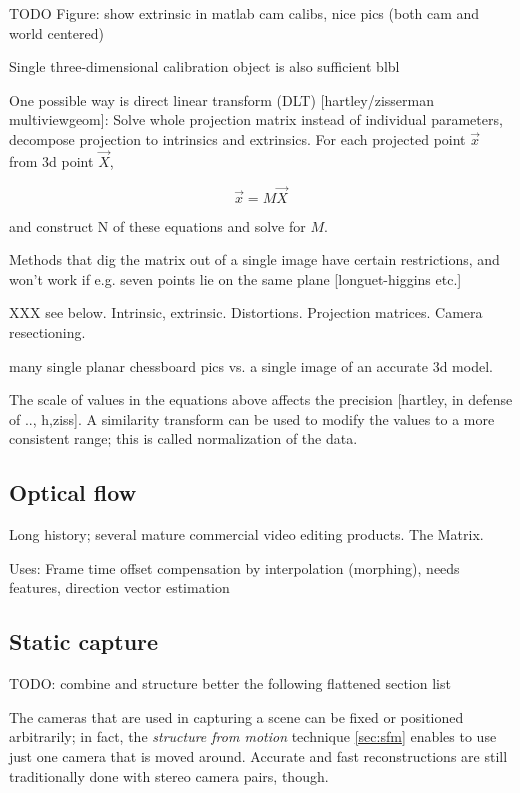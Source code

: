 TODO Figure: show extrinsic in matlab cam calibs, nice pics (both cam and world centered)

Single three-dimensional calibration object is also sufficient blbl

One possible way is direct linear transform (DLT) [hartley/zisserman multiviewgeom]: Solve whole projection matrix instead of individual parameters, decompose projection to intrinsics and extrinsics. For each projected point $\vec x$ from 3d point $\vec X$,

\[
	\vec x = M \vec X
\]

and construct N of these equations and solve for $M$.

Methods that dig the matrix out of a single image have certain restrictions, and won't work if e.g. seven points lie on the same plane [longuet-higgins etc.]

XXX see below. Intrinsic, extrinsic. Distortions. Projection matrices. Camera resectioning.

many single planar chessboard pics vs. a single image of an accurate 3d model.

The scale of values in the equations above affects the precision [hartley, in defense of .., h,ziss]. A similarity transform can be used to modify the values to a more consistent range; this is called normalization of the data.

\subsection{Optical flow}

Long history; several mature commercial video editing products. The Matrix.

Uses: Frame time offset compensation by interpolation (morphing), needs features, direction vector estimation

\subsection{Static capture}

TODO: combine and structure better the following flattened section list

The cameras that are used in capturing a scene can be fixed or positioned arbitrarily; in fact, the \textit{structure from motion} technique \ref{sec:sfm} enables to use just one camera that is moved around. Accurate and fast reconstructions are still traditionally done with stereo camera pairs, though.

